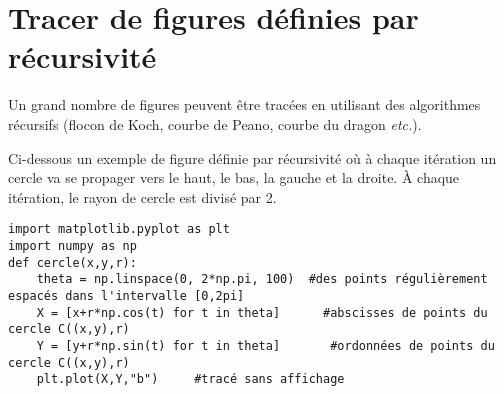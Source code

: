 \section{Tracer de figures définies par récursivité}
Un grand nombre de figures peuvent être tracées en utilisant des algorithmes récursifs (flocon de Koch, courbe de Peano, courbe du dragon \textit{etc.}).

Ci-dessous un exemple de figure définie par récursivité où à chaque itération un cercle va se propager vers le haut, le bas, la gauche et la droite. À chaque itération, le rayon de cercle est divisé par 2. 
\begin{lstlisting}
import matplotlib.pyplot as plt
import numpy as np
def cercle(x,y,r):
    theta = np.linspace(0, 2*np.pi, 100)  #des points régulièrement espacés dans l'intervalle [0,2pi]
    X = [x+r*np.cos(t) for t in theta]      #abscisses de points du cercle C((x,y),r)
    Y = [y+r*np.sin(t) for t in theta]       #ordonnées de points du cercle C((x,y),r)
    plt.plot(X,Y,"b")     #tracé sans affichage
\end{lstlisting}

